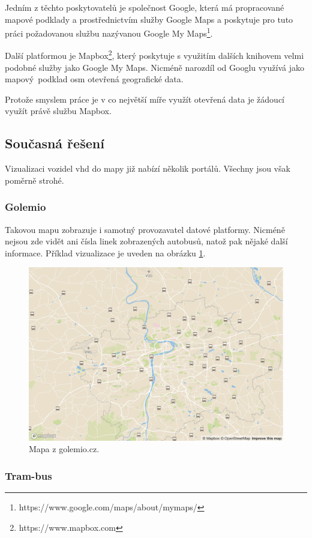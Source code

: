 \bigbreak

Jedním z těchto poskytovatelů je společnost Google, která má propracované mapové podklady a prostřednictvím služby Google Maps a poskytuje pro tuto práci požadovanou službu nazývanou Google My Maps\footnote{https://www.google.com/maps/about/mymaps/}.

\bigbreak

Další platformou je Mapbox\footnote{https://www.mapbox.com}, který poskytuje s využitím dalších knihovem velmi podobné služby jako Google My Maps. Nicméně narozdíl od Googlu využívá jako mapový podklad \gls{osm} {otevřená geografické data}.

\bigbreak

Protože smyslem práce je v co největší míře využít otevřená data je žádoucí využít právě službu Mapbox.

\subsection{Současná řešení} \label{subsection:soucasna_reseni_front_end}

Vizualizaci vozidel \gls{vhd} do mapy již nabízí několik portálů. Všechny jsou však poměrně strohé.

\subsubsection{Golemio}

Takovou mapu zobrazuje i samotný provozavatel datové platformy. Nicméně nejsou zde vidět ani čísla linek zobrazených autobusů, natož pak nějaké další informace. Příklad vizualizace je uveden na obrázku \ref{fig:golemio_result}.

\begin{figure}
	\centering
  \includegraphics[width=0.5\linewidth]{../img/golemio_mapa.png}
  \caption{Mapa z golemio.cz.}
  \label{fig:golemio_result}
\end{figure}

\subsubsection{Tram-bus}

